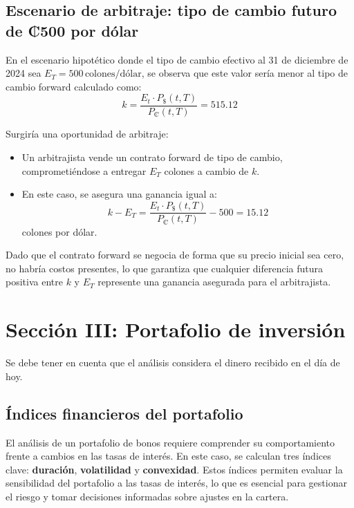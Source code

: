\documentclass[12pt]{article}
\begin{document}
\subsection{Escenario de arbitraje: tipo de cambio futuro de ₡500 por dólar}

En el escenario hipotético donde el tipo de cambio efectivo al 31 de diciembre de 2024 sea \( E_T = 500 \, \text{colones/dólar} \), se observa que este valor sería menor al tipo de cambio forward calculado como:
\[ k = \frac{E_t \cdot P_{\$}(t, T)}{P_{\text{₡}}(t, T)} = 515.12 \]

Surgiría una oportunidad de arbitraje:

\begin{itemize}
    \item Un arbitrajista vende un contrato forward de tipo de cambio, comprometiéndose a entregar \( E_T \) colones a cambio de \( k \).
    \item En este caso, se asegura una ganancia igual a:
    \[ k - E_T = \frac{E_t \cdot P_{\text{\$}}(t, T)}{P_{\text{₡}}(t, T)} - 500 = 15.12 \] colones por dólar.
\end{itemize}

Dado que el contrato forward se negocia de forma que su precio inicial sea cero, no habría costos presentes, lo que garantiza que cualquier diferencia futura positiva entre \( k \) y \( E_T \) represente una ganancia asegurada para el arbitrajista.



\newpage
\section{Sección III: Portafolio de inversión}

Se debe tener en cuenta que el análisis considera el dinero recibido en el día de hoy.

\subsection{Índices financieros del portafolio}

El análisis de un portafolio de bonos requiere comprender su comportamiento frente a cambios en las tasas de interés. En este caso, se calculan tres índices clave: \textbf{duración}, \textbf{volatilidad} y \textbf{convexidad}. Estos índices permiten evaluar la sensibilidad del portafolio a las tasas de interés, lo que es esencial para gestionar el riesgo y tomar decisiones informadas sobre ajustes en la cartera.
\end{document}

